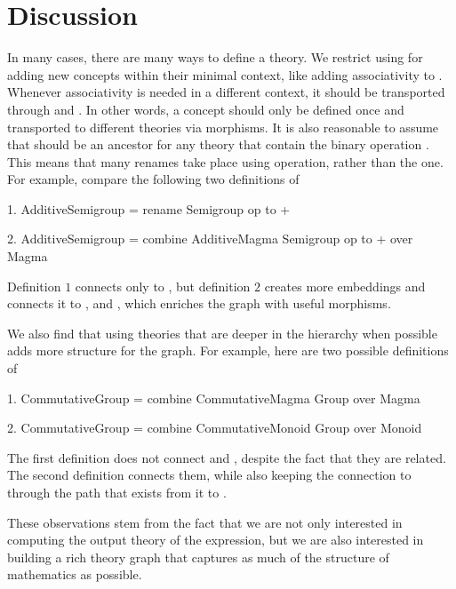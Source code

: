 \section{Discussion}
\label{sec:library:discussion}
In many cases, there are many ways to define a theory. We restrict using  for adding new concepts within their minimal context, like adding associativity to . Whenever associativity is needed in a different context, it should be transported through  and . In other words, a concept should only be defined once and transported to different theories via morphisms. It is also reasonable to assume that  should be an ancestor for any theory that contain the binary {operation \lstmath{+}}. This means that many renames take place using  operation, rather than the  one. For example, compare the following two definitions of  
\begin{togcode}
1. AdditiveSemigroup = rename Semigroup {op to +}
\end{togcode}
\begin{togcode}
2. AdditiveSemigroup = 
       combine AdditiveMagma {} Semigroup {op to +} over Magma 
\end{togcode}
Definition $1$ connects  only to , but definition $2$ creates more embeddings and connects it to ,  and , which enriches the graph with useful morphisms. 

We also find that using theories that are deeper in the hierarchy when possible adds more structure for the graph. For example, here are two possible definitions of    
\begin{togcode} 
1. CommutativeGroup = 
       combine CommutativeMagma {} Group {} over Magma
\end{togcode} 
\begin{togcode}
2. CommutativeGroup = 
       combine CommutativeMonoid {} Group {} over Monoid
\end{togcode}
The first definition does not connect  and , despite the fact that they are related. The second definition connects them, while also keeping the connection to  through the path that exists from it to . 

These observations stem from the fact that we are not only interested in computing the output theory of the expression, but we are also interested in building a rich theory graph that captures as much of the structure of mathematics as possible. 

